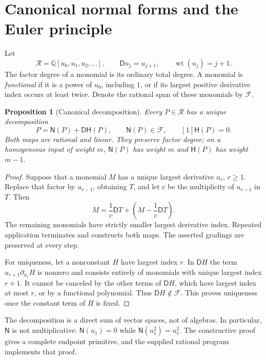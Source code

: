 \documentclass[11pt]{article}
\numberwithin{equation}{section}
\newtheorem{proposition}[theorem]{Proposition}
\theoremstyle{definition}\newtheorem{definition}[theorem]{Definition}
\theoremstyle{remark}\newtheorem{remark}[theorem]{Remark}
\newcommand{\Q}{\mathbb Q}\newcommand{\C}{\mathbb C}
\newcommand{\Rcal}{\mathscr R}
\newcommand{\NF}{\mathsf N}\newcommand{\Prim}{\mathsf H}
\newcommand{\D}{\mathsf D}\newcommand{\Euler}{\mathscr E}
\newcommand{\wt}{\operatorname{wt}}
\begin{document}

\section{Canonical normal forms and the Euler principle}
\label{sec:normal}

Let
\[
 \Rcal=\Q[u_0,u_1,u_2,\ldots],\qquad
 \D u_j=u_{j+1},\qquad \wt(u_j)=j+1.
\]
The factor degree of a monomial is its ordinary total degree.
A monomial is \emph{functional} if it is a power of $u_0$, including $1$,
or if its largest positive derivative index occurs at least twice.
Denote the rational span of these monomials by $\mathscr F$.

\begin{proposition}[Canonical decomposition]\label{prop:normal}
Every $P\in\Rcal$ has a unique decomposition
\begin{equation}\label{eq:decomp}
 P=\NF(P)+\D\Prim(P),\qquad
 \NF(P)\in\mathscr F,\qquad [1]\Prim(P)=0.
\end{equation}
Both maps are rational and linear. They preserve factor degree; on a
homogeneous input of weight $m$, $\NF(P)$ has weight $m$ and $\Prim(P)$
has weight $m-1$.
\end{proposition}
\begin{proof}
Suppose that a monomial $M$ has a unique largest derivative $u_r$,
$r\ge1$. Replace that factor by $u_{r-1}$, obtaining $T$, and let $c$
be the multiplicity of $u_{r-1}$ in $T$. Then
\[
 M=\frac1c\D T+\left(M-\frac1c\D T\right).
\]
The remaining monomials have strictly smaller largest derivative index.
Repeated application terminates and constructs both maps. The asserted
gradings are preserved at every step.

For uniqueness, let a nonconstant $H$ have largest index $r$. In $\D H$
the term $u_{r+1}\partial_{u_r}H$ is nonzero and consists entirely of
monomials with unique largest index $r+1$. It cannot be canceled by the
other terms of $\D H$, which have largest index at most $r$, or by a
functional polynomial. Thus $\D H\notin\mathscr F$. This proves
uniqueness once the constant term of $H$ is fixed.
\end{proof}

The decomposition is a direct sum of vector spaces, not of algebras.
In particular, $\NF$ is not multiplicative: $\NF(u_1)=0$ while
$\NF(u_1^2)=u_1^2$. The constructive proof gives a complete endpoint
primitive, and the supplied rational program implements that proof.
\end{document}
